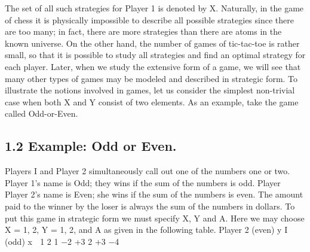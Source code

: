 The set of all such strategies for Player 1 is
denoted by X. Naturally, in the game of chess it is physically impossible to describe all
possible strategies since there are too many; in fact, there are more strategies than there
are atoms in the known universe. On the other hand, the number of games of tic-tac-toe
is rather small, so that it is possible to study all strategies and find an optimal strategy
for each player. Later, when we study the extensive form of a game, we will see that many
other types of games may be modeled and described in strategic form.
To illustrate the notions involved in games, let us consider the simplest non-trivial
case when both X and Y consist of two elements. As an example, take the game called
Odd-or-Even.
\subsection{1.2 Example: Odd or Even.} Players I and Player 2 simultaneously call out one of the
numbers one or two. Player 1’s name is Odd; they wins if the sum of the numbers is odd.
Player Player 2’s name is Even; she wins if the sum of the numbers is even. The amount paid to
the winner by the loser is always the sum of the numbers in dollars. To put this game in
strategic form we must specify X, Y and A. Here we may choose X = {1, 2}, Y = {1, 2},
and A as given in the following table.
Player 2 (even) y
I (odd) x

1 2
1 −2 +3
2 +3 −4


